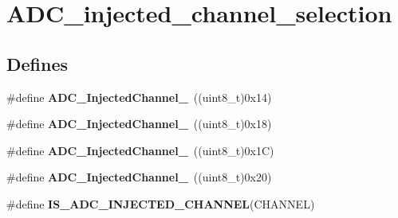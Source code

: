 \hypertarget{group__ADC__injected__channel__selection}{
\section{ADC\_\-injected\_\-channel\_\-selection}
\label{group__ADC__injected__channel__selection}
}
\subsection*{Defines}
\begin{DoxyCompactItemize}
\item 
\hypertarget{group__ADC__injected__channel__selection_ga8792d4ae0fa82dd317252c72815684ba}{
\#define {\bfseries ADC\_\-InjectedChannel\_}~((uint8\_\-t)0x14)}
\label{group__ADC__injected__channel__selection_ga8792d4ae0fa82dd317252c72815684ba}

\item 
\hypertarget{group__ADC__injected__channel__selection_ga2e322fccc7de16a0e79be573f5b1211c}{
\#define {\bfseries ADC\_\-InjectedChannel\_}~((uint8\_\-t)0x18)}
\label{group__ADC__injected__channel__selection_ga2e322fccc7de16a0e79be573f5b1211c}

\item 
\hypertarget{group__ADC__injected__channel__selection_ga6bf03d805645b942bdcc53504e772cf1}{
\#define {\bfseries ADC\_\-InjectedChannel\_}~((uint8\_\-t)0x1C)}
\label{group__ADC__injected__channel__selection_ga6bf03d805645b942bdcc53504e772cf1}

\item 
\hypertarget{group__ADC__injected__channel__selection_ga31d18bbcfa7b685e90c3a1313d9c6406}{
\#define {\bfseries ADC\_\-InjectedChannel\_}~((uint8\_\-t)0x20)}
\label{group__ADC__injected__channel__selection_ga31d18bbcfa7b685e90c3a1313d9c6406}

\item 
\#define {\bfseries IS\_\-ADC\_\-INJECTED\_\-CHANNEL}(CHANNEL)
\end{DoxyCompactItemize}


